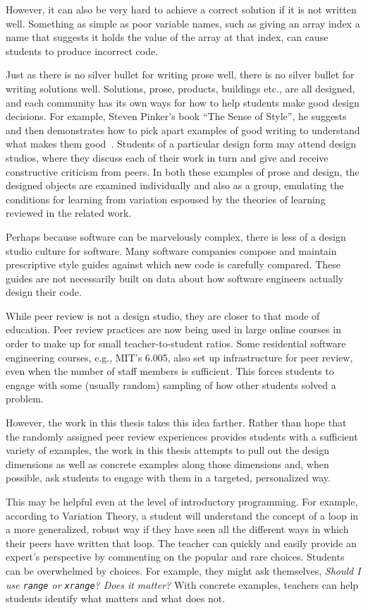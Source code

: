 However, it can also be very hard to achieve a correct solution if it is not written well. Something as simple as poor variable names, such as giving an array index a name that suggests it holds the value of the array at that index, can cause students to produce incorrect code.

Just as there is no silver bullet for writing prose well, there is no silver bullet for writing solutions well. Solutions, prose, products, buildings etc., are all designed, and each community has its own ways for how to help students make good design decisions. For example, Steven Pinker's book ``The Sense of Style'', he suggests and then demonstrates how to pick apart examples of good writing to understand what makes them good~\cite{pinkersense}. Students of a particular design form may attend design studios, where they discuss each of their work in turn and give and receive constructive criticism from peers. In both these examples of prose and design, the designed objects are examined individually and also as a group, emulating the conditions for learning from variation espoused by the theories of learning reviewed in the related work. 

Perhaps because software can be marvelously complex, there is less of a design studio culture for software. Many software companies compose and maintain prescriptive style guides against which new code is carefully compared. These guides are not necessarily built on data about how software engineers actually design their code. 

While peer review is not a design studio, they are closer to that mode of education. Peer review practices are now being used in large online courses in order to make up for small teacher-to-student ratios. Some residential software engineering courses, e.g., MIT's 6.005, also set up infrastructure for peer review, even when the number of staff members is sufficient. This forces students to engage with some (usually random) sampling of how other students solved a problem. 

However, the work in this thesis takes this idea farther. Rather than hope that the randomly assigned peer review experiences provides students with a sufficient variety of examples, the work in this thesis attempts to pull out the design dimensions as well as concrete examples along those dimensions and, when possible, ask students to engage with them in a targeted, personalized way. 

This may be helpful even at the level of introductory programming. For example, according to Variation Theory, a student will understand the concept of a loop in a more generalized, robust way if they have seen all the different ways in which their peers have written that loop. The teacher can quickly and easily provide an expert's perspective by commenting on the popular and rare choices. Students can be overwhelmed by choices. For example, they might ask themselves, {\it Should I use \texttt{range} or \texttt{xrange}? Does it matter?} With concrete examples, teachers can help students identify what matters and what does not. 


